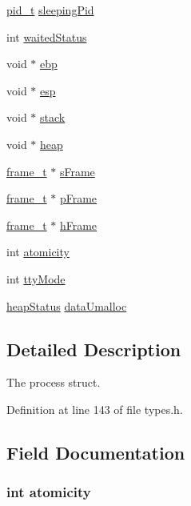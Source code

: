 \begin{DoxyCompactItemize}
\item 
\hyperlink{types_8h_ab612a3a4eb0e2ced1e55ecff76260458}{pid\_\-t} \hyperlink{structprocess__t_a51c991682921a9f2a4de5cf819c29f17}{sleepingPid}
\item 
int \hyperlink{structprocess__t_a302f417bbfe3271770ffef16d2b53959}{waitedStatus}
\item 
void $\ast$ \hyperlink{structprocess__t_a27f83ceda788165817cb18a475c91062}{ebp}
\item 
void $\ast$ \hyperlink{structprocess__t_a9a4b64202371e10f27f3769b73537182}{esp}
\item 
void $\ast$ \hyperlink{structprocess__t_afc0da95553742561773d762fa905fdab}{stack}
\item 
void $\ast$ \hyperlink{structprocess__t_a04510901b878d0d366fb541f823df97d}{heap}
\item 
\hyperlink{structframe__t}{frame\_\-t} $\ast$ \hyperlink{structprocess__t_a835da90e3143feb2586b1d88a186a32c}{sFrame}
\item 
\hyperlink{structframe__t}{frame\_\-t} $\ast$ \hyperlink{structprocess__t_afa88d15da39ad6f87338267449baaa26}{pFrame}
\item 
\hyperlink{structframe__t}{frame\_\-t} $\ast$ \hyperlink{structprocess__t_a597f5bd642c4a5d073a48ddd37ed0458}{hFrame}
\item 
int \hyperlink{structprocess__t_ae2d34916281a962b63074e700a0e4e68}{atomicity}
\item 
int \hyperlink{structprocess__t_a5db9aa2a3238730b35b1b99a3932b030}{ttyMode}
\item 
\hyperlink{structheap_status}{heapStatus} \hyperlink{structprocess__t_a19c110397be65fbeb224f20c1a21b76b}{dataUmalloc}
\end{DoxyCompactItemize}


\subsection{Detailed Description}
The process struct. 

Definition at line 143 of file types.h.



\subsection{Field Documentation}
\hypertarget{structprocess__t_ae2d34916281a962b63074e700a0e4e68}{
\subsubsection[{atomicity}]{\setlength{\rightskip}{0pt plus 5cm}int {\bf atomicity}}}
\label{structprocess__t_ae2d34916281a962b63074e700a0e4e68}


